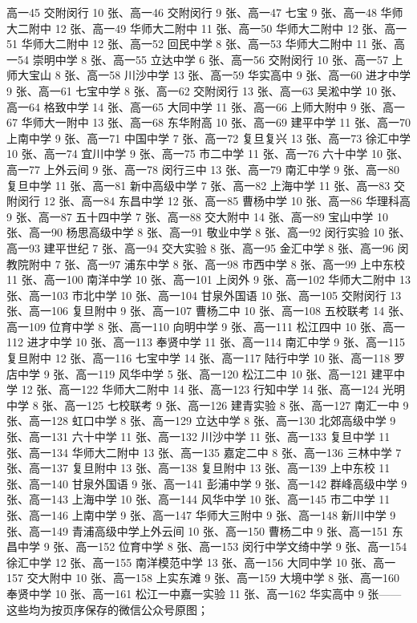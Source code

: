 \documentclass[a4paper,11pt]{article}
\begin{document}
高一45 交附闵行 10 张、高一46 交附闵行 9 张、高一47 七宝 9 张、高一48 华师大二附中 12 张、高一49 华师大二附中 11 张、高一50 华师大二附中 12 张、高一51 华师大二附中 12 张、高一52 回民中学 8 张、高一53 华师大二附中 11 张、高一54 崇明中学 8 张、高一55 立达中学 6 张、高一56 交附闵行 10 张、高一57 上师大宝山 8 张、高一58 川沙中学 13 张、高一59 华实高中 9 张、高一60 进才中学 9 张、高一61 七宝中学 8 张、高一62 交附闵行 13 张、高一63 吴淞中学 10 张、高一64 格致中学 14 张、高一65 大同中学 11 张、高一66 上师大附中 9 张、高一67 华师大一附中 13 张、高一68 东华附高 10 张、高一69 建平中学 11 张、高一70 上南中学 9 张、高一71 中国中学 7 张、高一72 复旦复兴 13 张、高一73 徐汇中学 10 张、高一74 宜川中学 9 张、高一75 市二中学 11 张、高一76 六十中学 10 张、高一77 上外云间 9 张、高一78 闵行三中 13 张、高一79 南汇中学 9 张、高一80 复旦中学 11 张、高一81 新中高级中学 7 张、高一82 上海中学 11 张、高一83 交附闵行 12 张、高一84 东昌中学 12 张、高一85 曹杨中学 10 张、高一86 华理科高 9 张、高一87 五十四中学 7 张、高一88 交大附中 14 张、高一89 宝山中学 10 张、高一90 杨思高级中学 8 张、高一91 敬业中学 8 张、高一92 闵行实验 10 张、高一93 建平世纪 7 张、高一94 交大实验 8 张、高一95 金汇中学 8 张、高一96 闵教院附中 7 张、高一97 浦东中学 8 张、高一98 市西中学 8 张、高一99 上中东校 11 张、高一100 南洋中学 10 张、高一101 上闵外 9 张、高一102 华师大二附中 13 张、高一103 市北中学 10 张、高一104 甘泉外国语 10 张、高一105 交附闵行 13 张、高一106 复旦附中 9 张、高一107 曹杨二中 10 张、高一108 五校联考 14 张、高一109 位育中学 8 张、高一110 向明中学 9 张、高一111 松江四中 10 张、高一112 进才中学 10 张、高一113 奉贤中学 11 张、高一114 南汇中学 9 张、高一115 复旦附中 12 张、高一116 七宝中学 14 张、高一117 陆行中学 10 张、高一118 罗店中学 9 张、高一119 风华中学 5 张、高一120 松江二中 10 张、高一121 建平中学 12 张、高一122 华师大二附中 14 张、高一123 行知中学 14 张、高一124 光明中学 8 张、高一125 七校联考 9 张、高一126 建青实验 8 张、高一127 南汇一中 9 张、高一128 虹口中学 8 张、高一129 立达中学 8 张、高一130 北郊高级中学 9 张、高一131 六十中学 11 张、高一132 川沙中学 11 张、高一133 复旦中学 11 张、高一134 华师大二附中 13 张、高一135 嘉定二中 8 张、高一136 三林中学 7 张、高一137 复旦附中 13 张、高一138 复旦附中 13 张、高一139 上中东校 11 张、高一140 甘泉外国语 9 张、高一141 彭浦中学 9 张、高一142 群峰高级中学 9 张、高一143 上海中学 10 张、高一144 风华中学 10 张、高一145 市二中学 11 张、高一146 上南中学 9 张、高一147 华师大三附中 9 张、高一148 新川中学 9 张、高一149 青浦高级中学上外云间 10 张、高一150 曹杨二中 9 张、高一151 东昌中学 9 张、高一152 位育中学 8 张、高一153 闵行中学文绮中学 9 张、高一154 徐汇中学 12 张、高一155 南洋模范中学 13 张、高一156 大同中学 10 张、高一157 交大附中 10 张、高一158 上实东滩 9 张、高一159 大境中学 8 张、高一160 奉贤中学 10 张、高一161 松江一中嘉一实验 11 张、高一162 华实高中 9 张------这些均为按页序保存的微信公众号原图；
\end{document}
